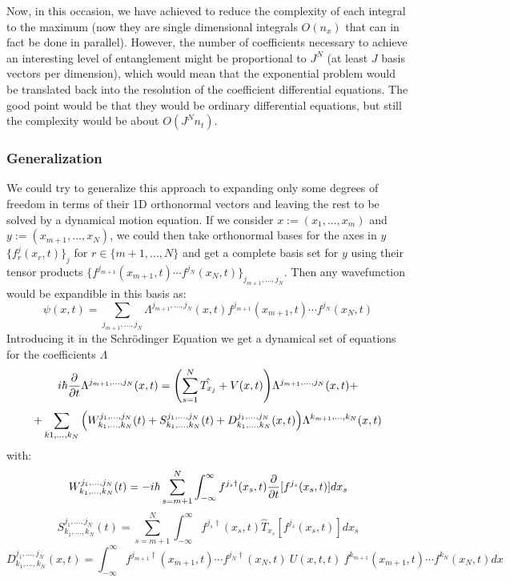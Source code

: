 \documentclass[11pt, a4paper]{article} %
\begin{document}
Now, in this occasion, we have achieved to reduce the complexity of each integral to the maximum (now they are single dimensional integrals $O(n_x)$ that can in fact be done in parallel). However, the number of coefficients necessary to achieve an interesting level of entanglement might be proportional to $J^N$ (at least $J$ basis vectors per dimension), which would mean that the exponential problem would be translated back into the resolution of the coefficient differential equations. The good point would be that they would be ordinary differential equations, but still the complexity would be about $O(J^Nn_t)$.

\subsubsection{Generalization}
We could try to generalize this approach to expanding only some degrees of freedom in terms of their 1D orthonormal vectors and leaving the rest to be solved by a dynamical motion equation. If we consider $x:=(x_1,...,x_m)$ and $y:=(x_{m+1},...,x_N)$, we could then take orthonormal bases for the axes in $y$ $\{ f^j_r(x_r,t) \}_j$ for $r\in\{m+1,...,N\}$ and get a complete basis set for $y$ using their tensor products $\{f^{j_{m+1}}(x_{m+1},t)\cdots f^{j_N}(x_N,t) \}_{j_{m+1},...,j_N}$. Then any wavefunction would be expandible in this basis as:
\begin{equation}
\psi(x,t)=\sum_{j_{m+1},...,j_N} \Lambda^{j_{m+1},...,j_N}(x,t) f^{j_{m+1}}(x_{m+1},t)\cdots f^{j_N}(x_N,t)
\end{equation}
Introducing it in the Schrödinger Equation we get a dynamical set of equations for the coefficients $\Lambda$
\begin{equation}
i\hbar \pdv{}{t} \Lambda^{j_{m+1},...,j_N}(x,t) = \qty(\sum_{s=1}^N\hat{T_{x_j}}+V(x,t) )\Lambda^{j_{m+1},...,j_N}(x,t)+
\end{equation}
$$
 +\sum_{k1,...,k_N} \qty(W^{j_1,...,j_N}_{k_1,...,k_N}(t)+S^{j_1,...,j_N}_{k_1,...,k_N}(t)+D^{j_1,...,j_N}_{k_1,...,k_N}(x,t))\Lambda^{k_{m+1},...,k_N}(x,t)
$$
with:
\begin{equation}
W^{j_1,...,j_N}_{k_1,...,k_N}(t)=-i\hbar \sum_{s=m+1}^N \int_{-\infty}^{\infty}f^{j_s\dagger}(x_s,t)\pdv{}{t}[f^{j_s}(x_s,t)]dx_s
\end{equation}
\begin{equation}
S^{j_1,...,j_N}_{k_1,...,k_N}(t)=\sum_{s=m+1}^N \int_{-\infty}^{\infty}f^{j_s\dagger}(x_s,t)\hat{T}_{x_s}[f^{j_s}(x_s,t)]dx_s
\end{equation}
\begin{equation}
D^{j_1,...,j_N}_{k_1,...,k_N}(x,t)=\int_{-\infty}^{\infty}f^{j_{m+1}\dagger}(x_{m+1},t)\cdots f^{j_N\dagger}(x_N,t)\ U(x,t,t)\ f^{k_{m+1}}(x_{m+1},t)\cdots f^{k_N}(x_N,t) dx
\end{equation}
\end{document}
